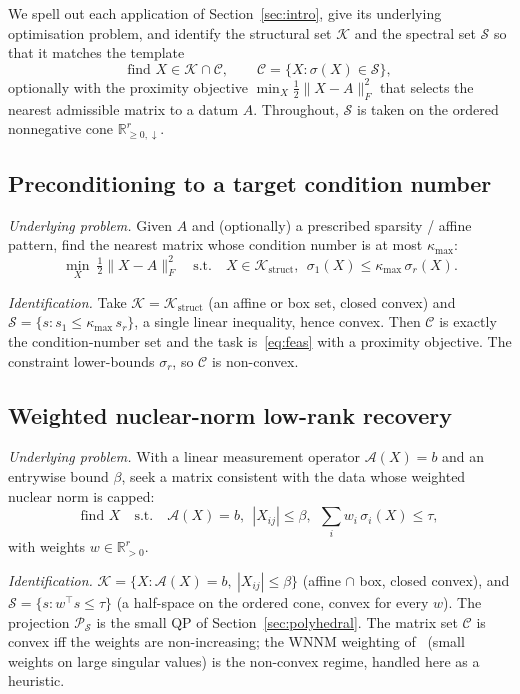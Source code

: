 \documentclass[journal]{IEEEtran}
\newcommand{\R}{\mathbb{R}}
\newcommand{\sgm}{\sigma}
\newcommand{\proj}{\mathcal{P}}
\newcommand{\spec}{\mathcal{S}}
\newcommand{\Kset}{\mathcal{K}}
\newcommand{\Cset}{\mathcal{C}}
\begin{document}
We spell out each application of Section~\ref{sec:intro}, give its
underlying optimisation problem, and identify the structural set $\Kset$
and the spectral set $\spec$ so that it matches the template
\[
\text{find } X \in \Kset \cap \Cset,
\qquad
\Cset = \{X : \sgm(X) \in \spec\},
\]
optionally with the proximity objective
$\min_X \tfrac12\|X-A\|_F^2$ that selects the nearest admissible matrix
to a datum $A$. Throughout, $\spec$ is taken on the ordered nonnegative
cone $\R^r_{\ge0,\downarrow}$.

\subsection{Preconditioning to a target condition number}
\emph{Underlying problem.} Given $A$ and (optionally) a prescribed
sparsity / affine pattern, find the nearest matrix whose condition
number is at most $\kappa_{\max}$:
\[
\min_{X}\ \tfrac12\|X-A\|_F^2
\quad\text{s.t.}\quad
X \in \Kset_{\mathrm{struct}},\ \
\sgm_1(X) \le \kappa_{\max}\,\sgm_r(X).
\]

\emph{Identification.} Take $\Kset = \Kset_{\mathrm{struct}}$ (an affine
or box set, closed convex) and
$\spec = \{ s : s_1 \le \kappa_{\max}\, s_r \}$, a single linear
inequality, hence convex. Then $\Cset$ is exactly the condition-number
set and the task is~\eqref{eq:feas} with a proximity objective. The
constraint lower-bounds $\sgm_r$, so $\Cset$ is non-convex.

\subsection{Weighted nuclear-norm low-rank recovery}
\emph{Underlying problem.} With a linear measurement operator
$\mathcal{A}(X)=b$ and an entrywise bound $\beta$, seek a matrix
consistent with the data whose weighted nuclear norm is capped:
\[
\text{find } X
\quad\text{s.t.}\quad
\mathcal{A}(X)=b,\ \ |X_{ij}|\le\beta,\ \
\sum_{i} w_i\,\sgm_i(X) \le \tau,
\]
with weights $w \in \R^r_{>0}$.

\emph{Identification.}
$\Kset = \{X : \mathcal{A}(X)=b,\ |X_{ij}|\le\beta\}$ (affine $\cap$ box,
closed convex), and $\spec=\{s : w^\top s \le \tau\}$ (a half-space on
the ordered cone, convex for every $w$). The projection $\proj_\spec$ is
the small QP of Section~\ref{sec:polyhedral}. The matrix set $\Cset$ is
convex iff the weights are non-increasing; the WNNM
weighting of~\cite{gu2017wnnm} (small weights on large singular values)
is the non-convex regime, handled here as a heuristic.
\end{document}
